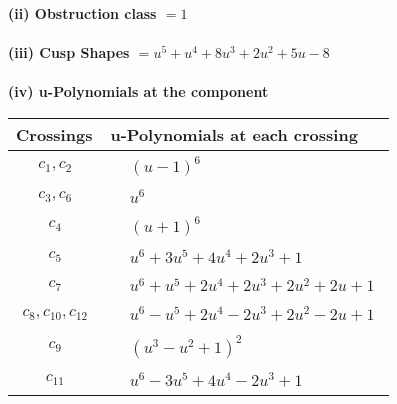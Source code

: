 \documentclass[1p]{elsarticle_modified}
\theoremstyle{definition}
\begin{document}
\flushleft \textbf{(ii) Obstruction class $= 1$}\\~\\
\flushleft \textbf{(iii) Cusp Shapes $= u^5+u^4+8 u^3+2 u^2+5 u-8$}\\~\\
\newpage\renewcommand{\arraystretch}{1}
\flushleft \textbf{(iv) u-Polynomials at the component}\newline \\
\begin{tabular}{m{50pt}|m{274pt}}
Crossings & \hspace{64pt}u-Polynomials at each crossing \\
\hline $$\begin{aligned}c_{1},c_{2}\end{aligned}$$&$\begin{aligned}
&(u-1)^6
\end{aligned}$\\
\hline $$\begin{aligned}c_{3},c_{6}\end{aligned}$$&$\begin{aligned}
&u^6
\end{aligned}$\\
\hline $$\begin{aligned}c_{4}\end{aligned}$$&$\begin{aligned}
&(u+1)^6
\end{aligned}$\\
\hline $$\begin{aligned}c_{5}\end{aligned}$$&$\begin{aligned}
&u^6+3 u^5+4 u^4+2 u^3+1
\end{aligned}$\\
\hline $$\begin{aligned}c_{7}\end{aligned}$$&$\begin{aligned}
&u^6+u^5+2 u^4+2 u^3+2 u^2+2 u+1
\end{aligned}$\\
\hline $$\begin{aligned}c_{8},c_{10},c_{12}\end{aligned}$$&$\begin{aligned}
&u^6- u^5+2 u^4-2 u^3+2 u^2-2 u+1
\end{aligned}$\\
\hline $$\begin{aligned}c_{9}\end{aligned}$$&$\begin{aligned}
&(u^3- u^2+1)^2
\end{aligned}$\\
\hline $$\begin{aligned}c_{11}\end{aligned}$$&$\begin{aligned}
&u^6-3 u^5+4 u^4-2 u^3+1
\end{aligned}$\\
\hline
\end{tabular}\\~\\
\end{document}
